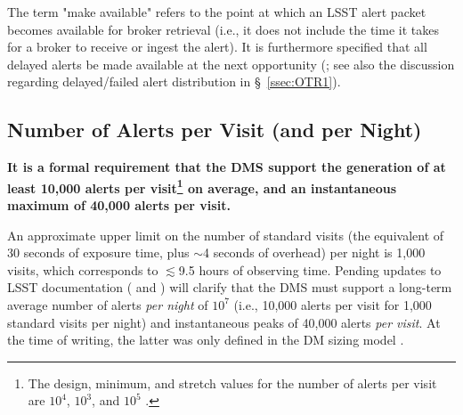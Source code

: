 \documentclass[DM,lsstdraft,authoryear,toc]{lsstdoc}
\begin{document}
The term "make available" refers to the point at which an LSST alert packet becomes available for broker retrieval (i.e., it does not include the time it takes for a broker to receive or ingest the alert). It is furthermore specified that all delayed alerts be made available at the next opportunity (; see also the discussion regarding delayed/failed alert distribution in \S~\ref{ssec:OTR1}).


\subsection{Number of Alerts per Visit (and per Night)}\label{ssec:transN}

{\bf It is a formal requirement that the DMS support the generation of  at least 10,000 alerts per visit\footnote{The design, minimum, and stretch values for the number of alerts per visit are $10^4$, $10^3$, and $10^5$ .} on average, and an instantaneous maximum of 40,000 alerts per visit.}

An approximate upper limit on the number of standard visits (the equivalent of 30 seconds of exposure time, plus $\sim$4 seconds of overhead) per night is 1,000 visits, which corresponds to $\lesssim$9.5 hours of observing time. Pending updates to LSST documentation ( and ) will clarify that the DMS must support a long-term average number of alerts {\it per night} of $10^7$ (i.e., 10,000 alerts per visit for 1,000 standard visits per night) and instantaneous peaks of 40,000 alerts {\it per visit}. At the time of writing, the latter was only defined in the DM sizing model .
\end{document}
